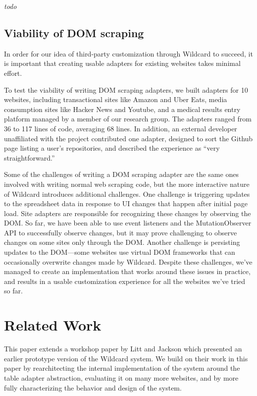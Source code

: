 \documentclass[sigplan,10pt,anonymous,review]{acmart}
\begin{document}
\emph{todo}

\hypertarget{viability-of-dom-scraping}{%
\subsection{Viability of DOM scraping}\label{viability-of-dom-scraping}}

In order for our idea of third-party customization through Wildcard to
succeed, it is important that creating usable adapters for existing
websites takes minimal effort.

To test the viability of writing DOM scraping adapters, we built
adapters for 10 websites, including transactional sites like Amazon and
Uber Eats, media consumption sites like Hacker News and Youtube, and a
medical results entry platform managed by a member of our research
group. The adapters ranged from 36 to 117 lines of code, averaging 68
lines. In addition, an external developer unaffiliated with the project
contributed one adapter, designed to sort the Github page listing a
user's repositories, and described the experience as ``very
straightforward.''

Some of the challenges of writing a DOM scraping adapter are the same
ones involved with writing normal web scraping code, but the more
interactive nature of Wildcard introduces additional challenges. One
challenge is triggering updates to the spreadsheet data in response to
UI changes that happen after initial page load. Site adapters are
responsible for recognizing these changes by observing the DOM. So far,
we have been able to use event listeners and the MutationObserver API to
successfully observe changes, but it may prove challenging to observe
changes on some sites only through the DOM. Another challenge is
persisting updates to the DOM---some websites use virtual DOM frameworks
that can occasionally overwrite changes made by Wildcard. Despite these
challenges, we've managed to create an implementation that works around
these issues in practice, and results in a usable customization
experience for all the websites we've tried so far.

\hypertarget{sec:related-work}{%
\section{Related Work}\label{sec:related-work}}

This paper extends a workshop paper by Litt and Jackson \citep{litt2020}
which presented an earlier prototype version of the Wildcard system. We
build on their work in this paper by rearchitecting the internal
implementation of the system around the table adapter abstraction,
evaluating it on many more websites, and by more fully characterizing
the behavior and design of the system.
\end{document}
